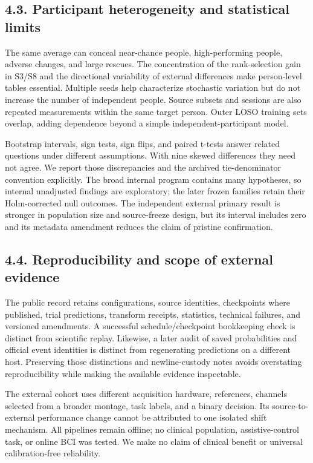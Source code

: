 \documentclass[11pt]{article}
\begin{document}
\subsection*{4.3. Participant heterogeneity and statistical limits}
The same average can conceal near-chance people, high-performing people, adverse changes, and large rescues. The concentration of the rank-selection gain in S3/S8 and the directional variability of external differences make person-level tables essential. Multiple seeds help characterize stochastic variation but do not increase the number of independent people. Source subsets and sessions are also repeated measurements within the same target person. Outer LOSO training sets overlap, adding dependence beyond a simple independent-participant model.

Bootstrap intervals, sign tests, sign flips, and paired t-tests answer related questions under different assumptions. With nine skewed differences they need not agree. We report those discrepancies and the archived tie-denominator convention explicitly. The broad internal program contains many hypotheses, so internal unadjusted findings are exploratory; the later frozen families retain their Holm-corrected null outcomes. The independent external primary result is stronger in population size and source-freeze design, but its interval includes zero and its metadata amendment reduces the claim of pristine confirmation.

\subsection*{4.4. Reproducibility and scope of external evidence}
The public record retains configurations, source identities, checkpoints where published, trial predictions, transform receipts, statistics, technical failures, and versioned amendments. A successful schedule/checkpoint bookkeeping check is distinct from scientific replay. Likewise, a later audit of saved probabilities and official event identities is distinct from regenerating predictions on a different host. Preserving those distinctions and newline-custody notes avoids overstating reproducibility while making the available evidence inspectable.

The external cohort uses different acquisition hardware, references, channels selected from a broader montage, task labels, and a binary decision. Its source-to-external performance change cannot be attributed to one isolated shift mechanism. All pipelines remain offline; no clinical population, assistive-control task, or online BCI was tested. We make no claim of clinical benefit or universal calibration-free reliability.
\end{document}
